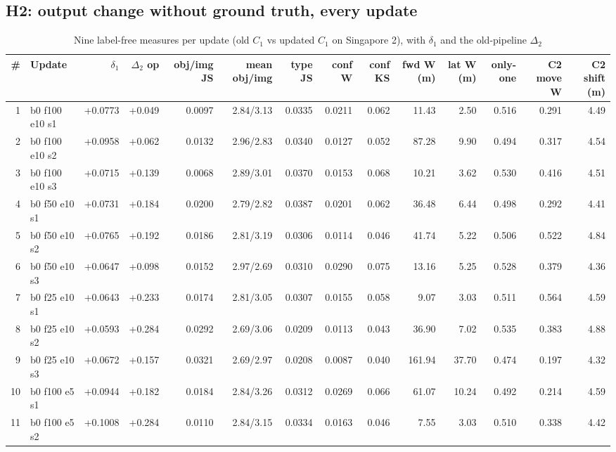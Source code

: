 \documentclass[10pt,a4paper]{article}
\begin{document}
\FloatBarrier
\begin{landscape}\section{H2: output change without ground truth, every update}\begin{table}[h!]\centering\scriptsize\caption{Nine label-free measures per update (old $C_1$ vs updated $C_1$ on Singapore 2), with $\delta_1$ and the old-pipeline $\Delta_2$}
\begin{tabular}{rlrrrrrrrrrrrr}\toprule
\# & Update & $\delta_1$ & $\Delta_2$ op & obj/img JS & mean obj/img & type JS & conf W & conf KS & fwd W (m) & lat W (m) & only-one & C2 move W & C2 shift (m)\\\midrule
1 & b0 f100 e10 s1 & +0.0773 & +0.049 & 0.0097 & 2.84/3.13 & 0.0335 & 0.0211 & 0.062 & 11.43 & 2.50 & 0.516 & 0.291 & 4.49\\
2 & b0 f100 e10 s2 & +0.0958 & +0.062 & 0.0132 & 2.96/2.83 & 0.0340 & 0.0127 & 0.052 & 87.28 & 9.90 & 0.494 & 0.317 & 4.54\\
3 & b0 f100 e10 s3 & +0.0715 & +0.139 & 0.0068 & 2.89/3.01 & 0.0370 & 0.0153 & 0.068 & 10.21 & 3.62 & 0.530 & 0.416 & 4.51\\
4 & b0 f50 e10 s1 & +0.0731 & +0.184 & 0.0200 & 2.79/2.82 & 0.0387 & 0.0201 & 0.062 & 36.48 & 6.44 & 0.498 & 0.292 & 4.41\\
5 & b0 f50 e10 s2 & +0.0765 & +0.192 & 0.0186 & 2.81/3.19 & 0.0306 & 0.0114 & 0.046 & 41.74 & 5.22 & 0.506 & 0.522 & 4.84\\
6 & b0 f50 e10 s3 & +0.0647 & +0.098 & 0.0152 & 2.97/2.69 & 0.0310 & 0.0290 & 0.075 & 13.16 & 5.25 & 0.528 & 0.379 & 4.36\\
7 & b0 f25 e10 s1 & +0.0643 & +0.233 & 0.0174 & 2.81/3.05 & 0.0307 & 0.0155 & 0.058 & 9.07 & 3.03 & 0.511 & 0.564 & 4.59\\
8 & b0 f25 e10 s2 & +0.0593 & +0.284 & 0.0292 & 2.69/3.06 & 0.0209 & 0.0113 & 0.043 & 36.90 & 7.02 & 0.535 & 0.383 & 4.88\\
9 & b0 f25 e10 s3 & +0.0672 & +0.157 & 0.0321 & 2.69/2.97 & 0.0208 & 0.0087 & 0.040 & 161.94 & 37.70 & 0.474 & 0.197 & 4.32\\
10 & b0 f100 e5 s1 & +0.0944 & +0.182 & 0.0184 & 2.84/3.26 & 0.0312 & 0.0269 & 0.066 & 61.07 & 10.24 & 0.492 & 0.214 & 4.59\\
11 & b0 f100 e5 s2 & +0.1008 & +0.284 & 0.0110 & 2.84/3.15 & 0.0334 & 0.0163 & 0.046 & 7.55 & 3.03 & 0.510 & 0.338 & 4.42\\

\end{tabular}
\end{table}
\end{landscape}
\end{document}
